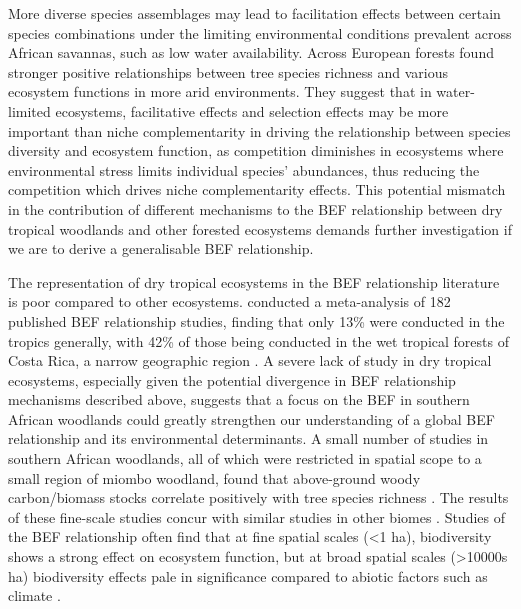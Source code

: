 \documentclass[11pt,a4paper]{article}
\begin{document}
More diverse species assemblages may lead to facilitation effects between certain species combinations under the limiting environmental conditions prevalent across African savannas, such as low water availability. Across European forests \citet{Ratcliffe2017} found stronger positive relationships between tree species richness and various ecosystem functions in more arid environments. They suggest that in water-limited ecosystems, facilitative effects and selection effects may be more important than niche complementarity in driving the relationship between species diversity and ecosystem function, as competition diminishes in ecosystems where environmental stress limits individual species' abundances, thus reducing the competition which drives niche complementarity effects. This potential mismatch in the contribution of different mechanisms to the BEF relationship between dry tropical woodlands and other forested ecosystems demands further investigation if we are to derive a generalisable BEF relationship.

The representation of dry tropical ecosystems in the BEF relationship literature is poor compared to other ecosystems. \citet{Clarke2017} conducted a meta-analysis of 182 published BEF relationship studies, finding that only 13\% were conducted in the tropics generally, with 42\% of those being conducted in the wet tropical forests of Costa Rica, a narrow geographic region \citep{Barthlott2005}. A severe lack of study in dry tropical ecosystems, especially given the potential divergence in BEF relationship mechanisms described above, suggests that a focus on the BEF in southern African woodlands could greatly strengthen our understanding of a global BEF relationship and its environmental determinants. A small number of studies in southern African woodlands, all of which were restricted in spatial scope to a small region of miombo woodland, found that above-ground woody carbon/biomass stocks correlate positively with tree species richness \citep{McNicol2018, Shirima2015, Mutowo2012}. The results of these fine-scale studies concur with similar studies in other biomes \citep{Cardinale2009}. Studies of the BEF relationship often find that at fine spatial scales (<1 ha), biodiversity shows a strong effect on ecosystem function, but at broad spatial scales  (>10000s ha) biodiversity effects pale in significance compared to abiotic factors such as climate \citep{Pasari2013}. 
\end{document}
